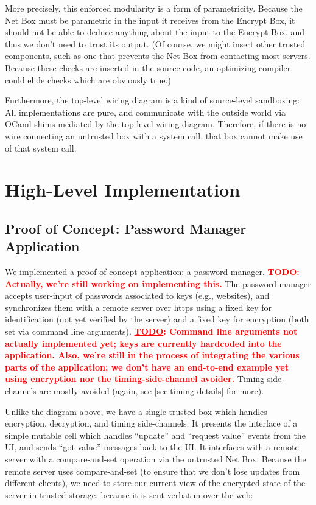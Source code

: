 \documentclass{article}
\newcommand{\todo}[1]{\textbf{\textcolor{red}{\underline{TODO}: #1}}}
\begin{document}
More precisely, this enforced modularity is a form of parametricity.  Because the Net Box must be parametric in the input it receives from the Encrypt Box, it should not be able to deduce anything about the input to the Encrypt Box, and thus we don't need to trust its output.  (Of course, we might insert other trusted components, such as one that prevents the Net Box from contacting most servers.  Because these checks are inserted in the source code, an optimizing compiler could elide checks which are obviously true.)

Furthermore, the top-level wiring diagram is a kind of source-level sandboxing:  All implementations are pure, and communicate with the outside world via OCaml shims mediated by the top-level wiring diagram.  Therefore, if there is no wire connecting an untrusted box with a system call, that box cannot make use of that system call.

\section{High-Level Implementation}
\subsection{Proof of Concept: Password Manager Application}
We implemented a proof-of-concept application: a password manager. \todo{Actually, we're still working on implementing this.}  The password manager accepts user-input of passwords associated to keys (e.g., websites), and synchronizes them with a remote server over https using a fixed key for identification (not yet verified by the server) and a fixed key for encryption (both set via command line arguments). \todo{Command line arguments not actually implemented yet; keys are currently hardcoded into the application.  Also, we're still in the process of integrating the various parts of the application; we don't have an end-to-end example yet using encryption nor the timing-side-channel avoider.}  Timing side-channels are mostly avoided (again, see \autoref{sec:timing-details} for more).

Unlike the diagram above, we have a single trusted box which handles encryption, decryption, and timing side-channels.  It presents the interface of a simple mutable cell which handles ``update'' and ``request value'' events from the UI, and sends ``got value'' messages back to the UI.  It interfaces with a remote server with a compare-and-set operation via the untrusted Net Box.  Because the remote server uses compare-and-set (to ensure that we don't lose updates from different clients), we need to store our current view of the encrypted state of the server in trusted storage, because it is sent verbatim over the web:
\end{document}
